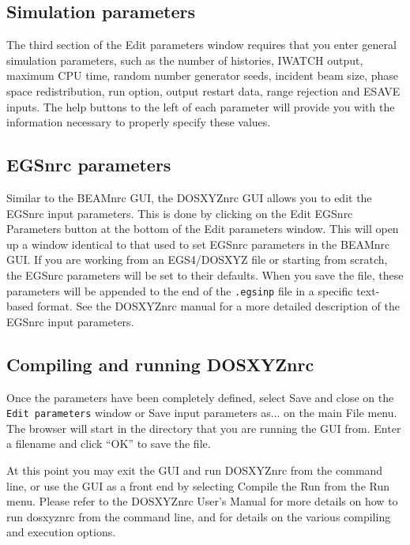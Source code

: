 \documentclass[12pt,twoside]{article}
\begin{document}
\subsection{Simulation parameters}

The third section of the {\sf Edit parameters} window requires that you
enter general simulation parameters, such as the number of histories,
IWATCH output, maximum CPU time, random number generator seeds,
incident beam size, phase space
redistribution, run option, output restart data, range rejection and ESAVE
inputs.  The help buttons to the left of each parameter will
provide you with the information necessary to properly specify these
values.

\subsection{EGSnrc parameters}

Similar to the BEAMnrc GUI, the DOSXYZnrc GUI allows you to edit the
EGSnrc input parameters.  This is done by clicking on the
{\sf Edit EGSnrc Parameters} button at the bottom of the
{\sf Edit parameters} window.  This will open up a window identical
to that used to set EGSnrc parameters in the BEAMnrc GUI.
If you are working
from an EGS4/DOSXYZ file or starting from scratch, the EGSnrc parameters
will be set to their defaults.  When you save the file,
these parameters will be appended to the end of the {\tt .egsinp} file
in a specific text-based format.  See the DOSXYZnrc manual for a more
detailed description of the EGSnrc input parameters.

\subsection{Compiling and running DOSXYZnrc}

Once the parameters have been completely defined, select
{\sf Save and close} on the {\tt Edit parameters} window or
{\sf Save input parameters as...} on
the main {\sf File} menu.  The browser will start in the
directory that you are running the GUI from.  Enter a filename and click
``OK'' to save the file.

At this point you may exit the GUI and run DOSXYZnrc from the command line,
or use the
GUI as a front end by selecting {\sf Compile} the {\sf Run} from the
{\sf Run} menu.  Please
refer to the DOSXYZnrc User's Manual\cite{WR04a} for more details on how to run dosxyznrc
from the command line, and for details on the various compiling and
execution options.
\end{document}
